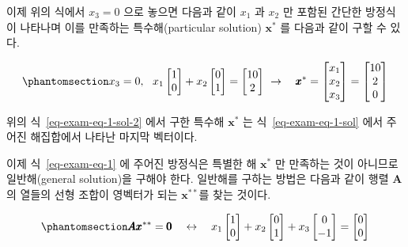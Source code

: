 \documentclass[
  11pt,
  a4paper,
  oneside]{scrbook}
\theoremstyle{definition}
\theoremstyle{definition}
\theoremstyle{plain}
\theoremstyle{remark}
\begin{document}
이제 위의 식에서 \(x_3=0\) 으로 놓으면 다음과 같이 \(x_1\) 과 \(x_2\) 만
포함된 간단한 방정식이 나타나며 이를 만족하는 특수해(particular
solution) \(\pmb x^*\) 를 다음과 같이 구할 수 있다.

\begin{equation}\phantomsection\label{eq-exam-eq-1-sol-2}{
x_3=0,~~
x_1
\begin{bmatrix}
1  \\
0  
\end{bmatrix}
+
x_2
\begin{bmatrix}
 0  \\
 1   
\end{bmatrix}
=
\begin{bmatrix}
10 \\
2
\end{bmatrix}
~ \rightarrow~~~
\pmb x^* =
\begin{bmatrix}
x_1 \\
x_2 \\
x_3 \end{bmatrix}
=
\begin{bmatrix}
10 \\
2 \\
0 \end{bmatrix}
}\end{equation}

위의 식~\ref{eq-exam-eq-1-sol-2} 에서 구한 특수해 \(\pmb x^*\) 는
식~\ref{eq-exam-eq-1-sol} 에서 주어진 해집합에서 나타난 마지막 벡터이다.

이제 식~\ref{eq-exam-eq-1} 에 주어진 방정식은 특별한 해 \(\pmb x^*\) 만
만족하는 것이 아니므로 일반해(general solution)을 구해야 한다. 일반해를
구하는 방법은 다음과 같이 행렬 \(\pmb A\)의 열들의 선형 조합이 영벡터가
되는 \(\pmb x^{**}\)를 찾는 것이다.

\begin{equation}\phantomsection\label{eq-exam-eq-1-sol-3}{
\pmb A \pmb x^{**} = \pmb 0
\quad \leftrightarrow \quad 
x_1
\begin{bmatrix}
1  \\
0  
\end{bmatrix}
+
x_2
\begin{bmatrix}
 0  \\
 1   
\end{bmatrix}
+ x_3
\begin{bmatrix}
 0 \\
-1 
\end{bmatrix}
=
\begin{bmatrix}
0 \\
0
\end{bmatrix}
}\end{equation}
\end{document}
